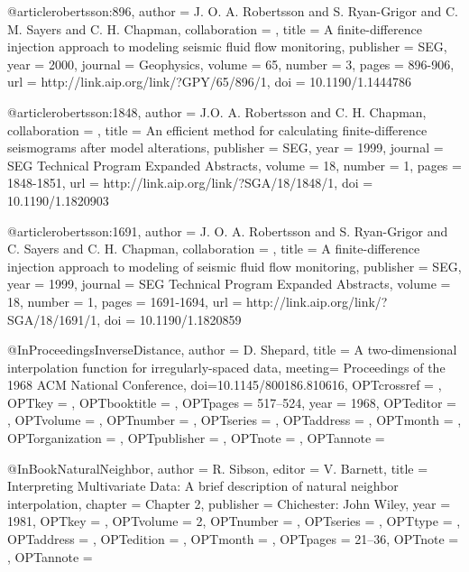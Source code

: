 @article{robertsson:896,
author = {J. O. A. Robertsson and S. Ryan-Grigor and C. M. Sayers and C. H. Chapman},
collaboration = {},
title = {A finite-difference injection approach to modeling seismic fluid flow monitoring},
publisher = {SEG},
year = {2000},
journal = {Geophysics},
volume = {65},
number = {3},
pages = {896-906},
url = {http://link.aip.org/link/?GPY/65/896/1},
doi = {10.1190/1.1444786}
}







@article{robertsson:1848,
author = {J.O. A. Robertsson and C. H. Chapman},
collaboration = {},
title = {An efficient method for calculating finite-difference seismograms after model alterations},
publisher = {SEG},
year = {1999},
journal = {SEG Technical Program Expanded Abstracts},
volume = {18},
number = {1},
pages = {1848-1851},
url = {http://link.aip.org/link/?SGA/18/1848/1},
doi = {10.1190/1.1820903}
}







@article{robertsson:1691,
author = {J. O. A. Robertsson and S.  Ryan-Grigor and C. Sayers and C. H. Chapman},
collaboration = {},
title = {A finite-difference injection approach to modeling of seismic fluid flow monitoring},
publisher = {SEG},
year = {1999},
journal = {SEG Technical Program Expanded Abstracts},
volume = {18},
number = {1},
pages = {1691-1694},
url = {http://link.aip.org/link/?SGA/18/1691/1},
doi = {10.1190/1.1820859}
}


@InProceedings{InverseDistance,
  author = 	 {D. Shepard},
  title = 	 {A two-dimensional interpolation function for
                  irregularly-spaced data},
  meeting= {Proceedings of the 1968 ACM National Conference},
  doi={10.1145/800186.810616},
  OPTcrossref =  {},
  OPTkey = 	 {},
  OPTbooktitle = {},
  OPTpages = 	 {517–524},
  year = 	 {1968},
  OPTeditor = 	 {},
  OPTvolume = 	 {},
  OPTnumber = 	 {},
  OPTseries = 	 {},
  OPTaddress = 	 {},
  OPTmonth = 	 {},
  OPTorganization = {},
  OPTpublisher = {},
  OPTnote = 	 {},
  OPTannote = 	 {}
}

@InBook{NaturalNeighbor,
  author = 	 {R. Sibson},
  editor = 	 {V. Barnett},
  title = 	 {Interpreting Multivariate Data: A brief description of natural neighbor interpolation},
  chapter = 	 {Chapter 2},
  publisher = 	 {Chichester: John Wiley},
  year = 	 {1981},
  OPTkey = 	 {},
  OPTvolume = 	 {2},
  OPTnumber = 	 {},
  OPTseries = 	 {},
  OPTtype = 	 {},
  OPTaddress = 	 {},
  OPTedition = 	 {},
  OPTmonth = 	 {},
  OPTpages = 	 {21–36},
  OPTnote = 	 {},
  OPTannote = 	 {}
}

